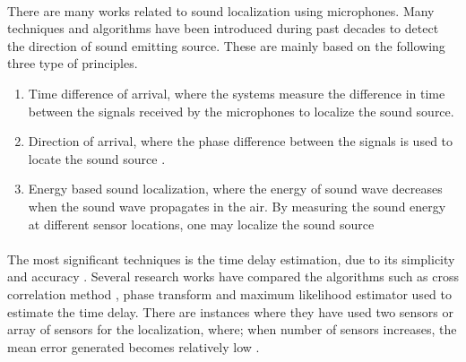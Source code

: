 \documentclass[11pt]{article}
\numberwithin{figure}{section}
\numberwithin{table}{section}
\begin{document}
\paragraph{}
There are many works related to sound localization using microphones. Many techniques and algorithms have been introduced during past decades to detect the direction of sound emitting source. These are mainly based on the following three type of principles.
\begin{enumerate}
\item Time difference of arrival, where the systems measure the difference in time between the signals received by the microphones to localize the sound source.
\item Direction of arrival, where the phase difference between the signals is used to locate the sound source \cite {20}.
\item Energy based sound localization, where the energy of sound wave decreases when the sound wave propagates in the air. By measuring the sound energy at different sensor locations, one may localize the sound source \cite {21}
\end{enumerate}

\paragraph{}
The most significant techniques is the time delay estimation, due to its simplicity and accuracy \cite {22}. Several research works have compared the algorithms such as cross correlation method \cite {23}, phase transform \cite {24} and maximum likelihood estimator \cite {25} used to estimate the time delay. There are instances where they have used two sensors or array of sensors for the localization, where; when number of sensors increases, the mean error generated becomes relatively low \cite {26}.
\end{document}
